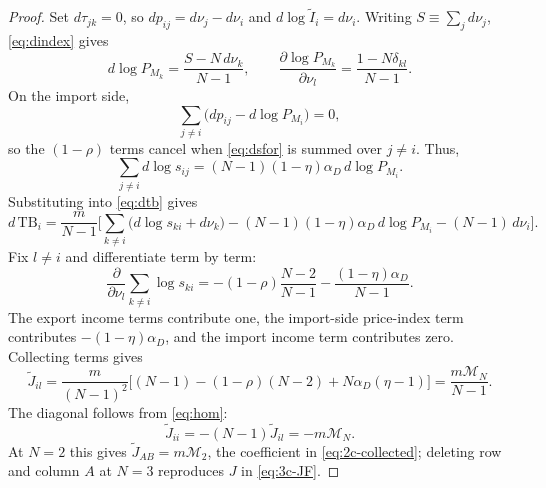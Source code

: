 \documentclass[11pt]{article}
\begin{document}
\begin{proof}
Set $d\tau_{jk}=0$, so $dp_{ij}=d\nu_j-d\nu_i$ and $d\log\widetilde I_i=d\nu_i$. Writing $S\equiv\sum_j d\nu_j$, \eqref{eq:dindex} gives
\[
d\log P_{M_k} = \frac{S-N\,d\nu_k}{N-1},
\qquad
\frac{\partial\log P_{M_k}}{\partial\nu_l} = \frac{1-N\delta_{kl}}{N-1}.
\]
On the import side,
\[
\sum_{j\neq i} \big( dp_{ij}-d\log P_{M_i} \big) = 0,
\]
so the $(1-\rho)$ terms cancel when \eqref{eq:dsfor} is summed over $j\neq i$. Thus,
\[
\sum_{j\neq i}d\log s_{ij} = (N-1)(1-\eta)\alpha_D\,d\log P_{M_i}.
\]
Substituting into \eqref{eq:dtb} gives
\[
d\,\mathrm{TB}_i = \frac{m}{N-1} \Big[ \sum_{k\neq i} \big( d\log s_{ki}+d\nu_k \big) - (N-1)(1-\eta)\alpha_D\,d\log P_{M_i} - (N-1)\,d\nu_i \Big].
\]
Fix $l\neq i$ and differentiate term by term:
\[
\frac{\partial}{\partial\nu_l} \sum_{k\neq i}\log s_{ki} = -(1-\rho)\frac{N-2}{N-1} - \frac{(1-\eta)\alpha_D}{N-1}.
\]
The export income terms contribute one, the import-side price-index term contributes $-(1-\eta)\alpha_D$, and the import income term contributes zero. Collecting terms gives
\[
\widetilde J_{il} = \frac{m}{(N-1)^2} \Big[ (N-1) - (1-\rho)(N-2) + N\alpha_D(\eta-1) \Big] = \frac{m\mathcal M_N}{N-1}.
\]
The diagonal follows from \eqref{eq:hom}:
\[
\widetilde J_{ii} = -(N-1)\widetilde J_{il} = -m\mathcal M_N.
\]
At $N=2$ this gives $\widetilde J_{AB}=m\mathcal M_2$, the coefficient in \eqref{eq:2c-collected}; deleting row and column $A$ at $N=3$ reproduces $J$ in \eqref{eq:3c-JF}.
\end{proof}
\end{document}
